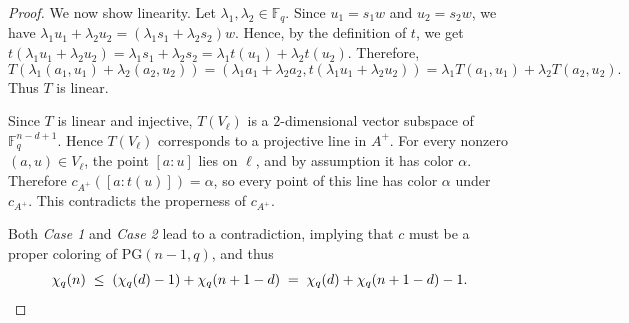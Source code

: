 \documentclass[10pt,a4paper]{amsart}
\begin{document}
\begin{proof}
We now show linearity.
Let $\lambda_1,\lambda_2\in\mathbb F_q$. Since $u_1=s_1w$ and $u_2=s_2w$, we have $\lambda_1u_1+\lambda_2u_2=(\lambda_1s_1+\lambda_2s_2)w$. Hence, by the definition of $t$, we get $t(\lambda_1u_1+\lambda_2u_2)=\lambda_1s_1+\lambda_2s_2=\lambda_1t(u_1)+\lambda_2t(u_2)$.
Therefore,
\[
T(\lambda_1(a_1,u_1)+\lambda_2(a_2,u_2))
=
(\lambda_1a_1+\lambda_2a_2,t(\lambda_1u_1+\lambda_2u_2))
=
\lambda_1T(a_1,u_1)+\lambda_2T(a_2,u_2).
\]
Thus $T$ is linear.

Since $T$ is linear and injective, $T(V_\ell)$ is a $2$-dimensional vector subspace of $\mathbb F_q^{n-d+1}$. Hence $T(V_\ell)$ corresponds to a projective line in $A^+$.
For every nonzero $(a,u)\in V_\ell$, the point $[a:u]$ lies on $\ell$, and by assumption it has color $\alpha$. Therefore $c_{A^+}([a:t(u)])=\alpha$, so every point of this line has color $\alpha$ under $c_{A^+}$.
This contradicts the properness of $c_{A^+}$.

\vspace{2ex}
\noindent
Both \textit{Case 1} and \textit{Case 2} lead to a contradiction, implying that $c$ must be a proper coloring of $\mathrm{PG}(n - 1, q)$, and thus
\[
\chi_q(n)\;\le\; (\chi_q(d)-1)+\chi_q(n+1-d)\;=\;\chi_q(d)+\chi_q(n+1-d)-1. \qedhere
\]
\end{proof}
\end{document}
